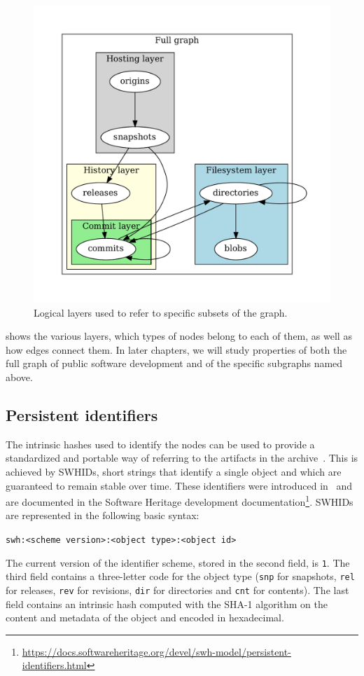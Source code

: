 \begin{figure}
    \centering
    \includegraphics[width=0.6\linewidth,trim=1cm 1cm 1cm 1cm]{img/swh-layers}
    \caption{Logical layers used to refer to specific subsets of the graph.}%
    \label{fig:layers}
\end{figure}
 shows the various layers, which types of nodes belong to
each of them, as well as how edges connect them. In later chapters, we will
study properties of both the full graph of public software development and of
the specific subgraphs named above.


\subsection{Persistent identifiers}%
\label{sec:swhid}

The intrinsic hashes used to identify the nodes can be used to provide a
standardized and portable way of referring to the artifacts in the
archive~\cite{swhipres2018}. This is achieved by \glspl{SWHID},
short strings that identify a single object and which are guaranteed to remain
stable over time.  These identifiers were introduced in~\cite{cise-2020-doi}
and are documented in the Software Heritage development
documentation\footnote{\url{https://docs.softwareheritage.org/devel/swh-model/persistent-identifiers.html}}.
\glspl{SWHID} are represented in the following basic syntax:

\texttt{swh:<scheme version>:<object type>:<object id>}

The current version of the identifier scheme, stored in the second field, is
\texttt{1}. The third field contains a three-letter code for the object type
(\texttt{snp} for snapshots, \texttt{rel} for releases, \texttt{rev} for
revisions, \texttt{dir} for directories and \texttt{cnt} for contents). The
last field contains an intrinsic hash computed with the SHA-1 algorithm on the
content and metadata of the object and encoded in hexadecimal.

